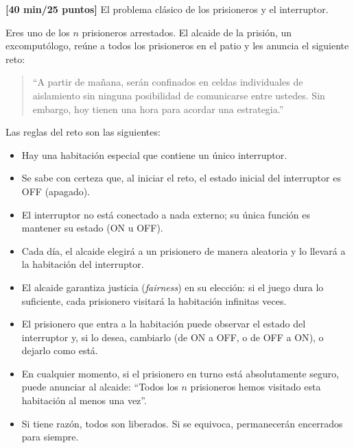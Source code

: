 \item[\textbf{3.}] \textbf{[40 min/25 puntos]} \textcolor{dkgreen}{El problema clásico de los prisioneros y el interruptor.}

    \textcolor{dkgreen}{Eres uno de los $n$ prisioneros arrestados. El alcaide de la prisión, un excomputólogo, reúne a todos los prisioneros en el patio y les anuncia el siguiente reto:}

    \begin{quote}
    \textcolor{azul}{``A partir de mañana, serán confinados en celdas individuales de aislamiento sin ninguna posibilidad de comunicarse entre ustedes. Sin embargo, hoy tienen una hora para acordar una estrategia.''}
    \end{quote}

    \textcolor{dkgreen}{Las reglas del reto son las siguientes:}

    \begin{itemize}
        \item \textcolor{dkgreen}{Hay una habitación especial que contiene un único interruptor.}
        \item \textcolor{dkgreen}{Se sabe con certeza que, al iniciar el reto, el estado inicial del interruptor es \textsc{OFF} (apagado).}
        \item \textcolor{dkgreen}{El interruptor no está conectado a nada externo; su única función es mantener su estado (\textsc{ON} u \textsc{OFF}).}
        \item \textcolor{dkgreen}{Cada día, el alcaide elegirá a un prisionero de manera aleatoria y lo llevará a la habitación del interruptor.}
        \item \textcolor{dkgreen}{El alcaide garantiza justicia (\textit{fairness}) en su elección: si el juego dura lo suficiente, cada prisionero visitará la habitación infinitas veces.}
        \item \textcolor{dkgreen}{El prisionero que entra a la habitación puede observar el estado del interruptor y, si lo desea, cambiarlo (de \textsc{ON} a \textsc{OFF}, o de \textsc{OFF} a \textsc{ON}), o dejarlo como está.}
        \item \textcolor{dkgreen}{En cualquier momento, si el prisionero en turno está absolutamente seguro, puede anunciar al alcaide: ``Todos los $n$ prisioneros hemos visitado esta habitación al menos una vez''.}
        \item \textcolor{dkgreen}{Si tiene razón, todos son liberados. Si se equivoca, permanecerán encerrados para siempre.}
    \end{itemize}

